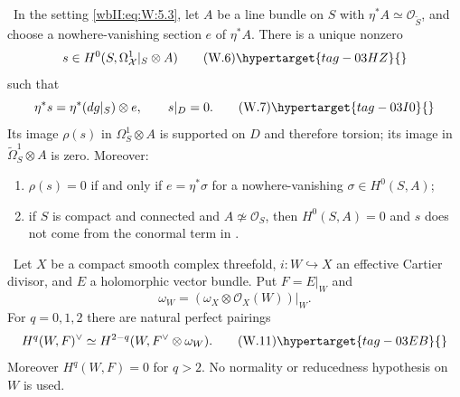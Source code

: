 \begin{theorem}
\hypertarget{tag-03IK}{}\label{wbII:prop:conductor}

\label{wbII:prop:conductor-differential}
\ In the setting \eqref{wbII:eq:W:5.3}, let $A$ be a line bundle on $S$ with
$\eta^*A\simeq\mathcal O_{\widetilde S}$, and choose a nowhere-vanishing
section $e$ of $\eta^*A$.  There is a unique nonzero
\[
s\in H^0(S,\Omega^1_{\mathcal X}|_S\otimes A)
\tag{W.6}\hypertarget{tag-03HZ}{}\label{wbII:eq:W:5.6}
\]
such that
\[
\eta^*s=\eta^*(dg|_S)\otimes e,\qquad s|_D=0.
\tag{W.7}\hypertarget{tag-03I0}{}\label{wbII:eq:W:5.7}
\]
Its image $\rho(s)$ in $\Omega^1_S\otimes A$ is supported on $D$ and
therefore torsion; its image in
$\widetilde\Omega^1_S\otimes A$ is zero.  Moreover:
\begin{enumerate}[label=(\alph*)]
\item $\rho(s)=0$ if and only if $e=\eta^*\sigma$ for a nowhere-vanishing
$\sigma\in H^0(S,A)$;
\item if $S$ is compact and connected and $A\not\simeq\mathcal O_S$, then
$H^0(S,A)=0$ and $s$ does not come from the conormal term in .
\end{enumerate}
\end{theorem}

\begin{theorem}
\hypertarget{tag-03IY}{}\label{wbII:thm:cartier-duality}


\ Let $X$ be a compact smooth complex threefold,
$i:W\hookrightarrow X$ an effective Cartier divisor, and $E$ a holomorphic
vector bundle.  Put $F=E|_W$ and
\[
\omega_W=(\omega_X\otimes\mathcal O_X(W))|_W.
\]
For $q=0,1,2$ there are natural perfect pairings
\[
H^q(W,F)^\vee
\simeq H^{2-q}(W,F^\vee\otimes\omega_W).
\tag{W.11}\hypertarget{tag-03EB}{}\label{wbII:eq:W:5.11}
\]
Moreover $H^q(W,F)=0$ for $q>2$.  No normality or reducedness hypothesis on
$W$ is used.
\end{theorem}

